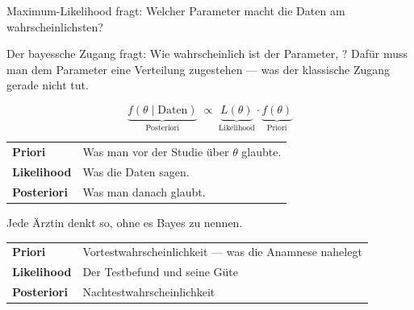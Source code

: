\begin{merksatz}
Maximum-Likelihood fragt: Welcher Parameter macht die Daten am wahrscheinlichsten?

Der bayessche Zugang fragt: Wie wahrscheinlich ist der Parameter, ? Dafür muss man dem Parameter eine Verteilung zugestehen --- was der klassische Zugang gerade nicht tut.

\[ \underbrace{f(\theta \mid \text{Daten})}_{\text{Posteriori}} \;\propto\; \underbrace{L(\theta)}_{\text{Likelihood}} \cdot \underbrace{f(\theta)}_{\text{Priori}} \]

\begin{center}
\renewcommand{\arraystretch}{1.5}
\begin{tabular}{@{}P{2.2cm}P{6.4cm}@{}}
\toprule
\textbf{Priori} & Was man vor der Studie über $\theta$ glaubte.\\
\textbf{Likelihood} & Was die Daten sagen.\\
\textbf{Posteriori} & Was man danach glaubt.\\
\bottomrule
\end{tabular}
\end{center}
\end{merksatz}

\begin{merksatz}
Jede Ärztin denkt so, ohne es Bayes zu nennen.

\begin{center}
\renewcommand{\arraystretch}{1.5}
\begin{tabular}{@{}P{2.6cm}P{6.0cm}@{}}
\toprule
\textbf{Priori} & Vortestwahrscheinlichkeit --- was die Anamnese nahelegt\\
\textbf{Likelihood} & Der Testbefund und seine Güte\\
\textbf{Posteriori} & Nachtestwahrscheinlichkeit\\
\bottomrule
\end{tabular}
\end{center}

\begin{center}
\begin{minipage}{0.88\textwidth}
\end{minipage}
\end{center}
\end{merksatz}

